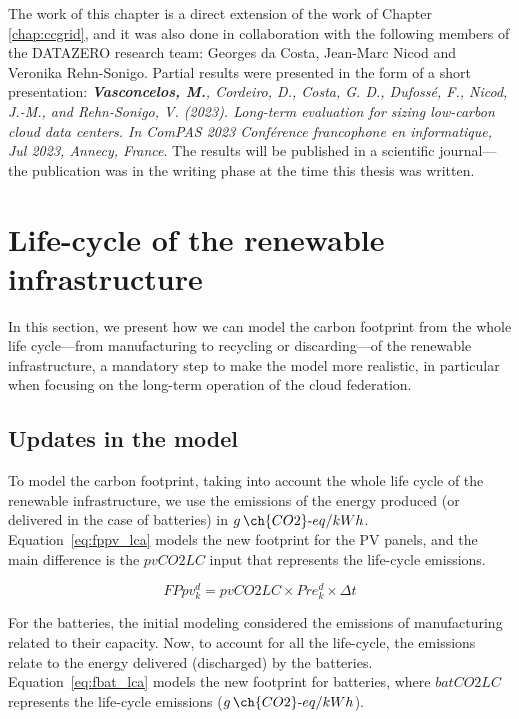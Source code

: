 The work of this chapter is a direct extension of the work of Chapter \ref{chap:ccgrid}, and it was also done in collaboration with the following members of the DATAZERO\cite{datazero} research team: Georges da Costa, Jean-Marc Nicod and Veronika Rehn-Sonigo. Partial results were presented in the form of a short presentation:   \textit{\textbf{Vasconcelos, M.}, Cordeiro, D., Costa, G. D., Dufossé, F., Nicod, J.-M., and Rehn-Sonigo, V. (2023). Long-term evaluation for sizing low-carbon cloud data centers. In ComPAS 2023 Conférence francophone en informatique, Jul 2023, Annecy, France}. The results will be published in a scientific journal---the publication was in the writing phase at the time this thesis was written. 




\section{Life-cycle of the renewable infrastructure}
\label{sec:lifecicle}

In this section, we present how we can model the carbon footprint from the whole life cycle---from manufacturing to recycling or discarding---of the renewable infrastructure,  a mandatory step to make the model more realistic, in particular when focusing on the long-term operation of the cloud federation.


\subsection{Updates in the model}



To model the carbon footprint, taking into account the whole life cycle of the renewable infrastructure,  we use the emissions of the energy produced (or delivered in the case of batteries) in $g\,\ch{CO2}\text{-}eq/kWh$. Equation~\eqref{eq:fppv_lca} models the new footprint for the PV panels, and the main difference is the $pvCO2LC$ input that represents the life-cycle emissions.

\begin{equation} \label{eq:fppv_lca}
   FPpv^d_k =  pvCO2LC \times Pre_k^d \times \Delta t
\end{equation}

For the batteries, the initial modeling considered the emissions of manufacturing related to their capacity. Now, to account for all the life-cycle, the emissions relate to the energy delivered (discharged) by the batteries. Equation~\eqref{eq:fbat_lca} models the new footprint for batteries, where $batCO2LC$ represents the life-cycle emissions  ($g\,\ch{CO2}\text{-}eq/kWh$).

